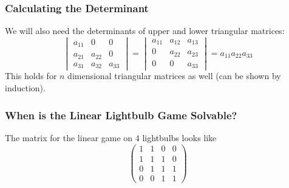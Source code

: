 \documentclass{beamer}
\newcommand{\off}{white}
\begin{document}
\begin{frame}
    \frametitle{Calculating the Determinant}
    We will also need the determinants of upper and lower triangular matrices:
    \[
        \begin{vmatrix}
            a_{11} & 0 & 0\\
            a_{21} & a_{22} & 0\\
            a_{31} & a_{32} & a_{33}
        \end{vmatrix}
        =
        \begin{vmatrix}
            a_{11} & a_{12} & a_{13}\\
            0 & a_{22} & a_{23}\\
            0 & 0 & a_{33}
        \end{vmatrix}
        = a_{11}a_{22}a_{33}
    \]
    \pause
    This holds for $n$ dimensional triangular matrices as well (can be shown by
    induction).
\end{frame}

\begin{frame}
\frametitle{When is the Linear Lightbulb Game Solvable?}
The matrix for the linear game on $4$ lightbulbs looks like
\[
    \begin{pmatrix}
        1 & 1 & 0 & 0\\
        1 & 1 & 1 & 0\\
        0 & 1 & 1 & 1\\
        0 & 0 & 1 & 1
    \end{pmatrix}
\]

\begin{figure}[!h]
    \centering
\end{figure}
\end{frame}
\end{document}

